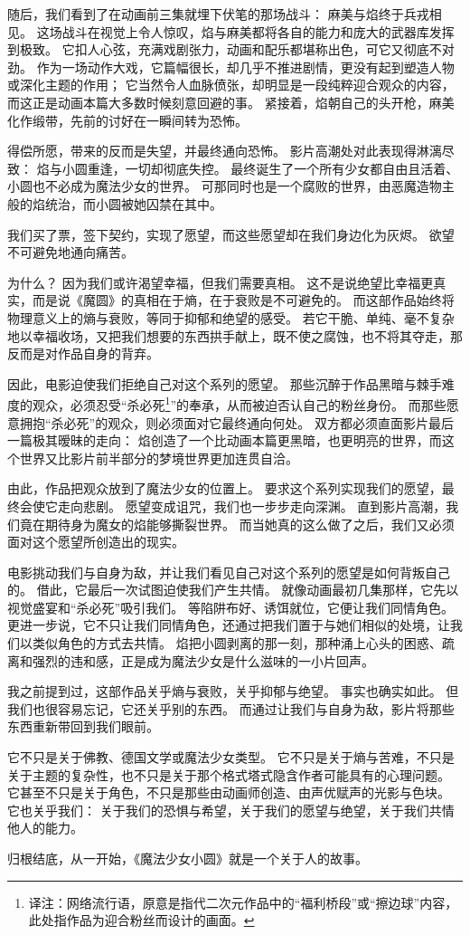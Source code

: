 随后，我们看到了在动画前三集就埋下伏笔的那场战斗：
麻美与焰终于兵戎相见。
这场战斗在视觉上令人惊叹，焰与麻美都将各自的能力和庞大的武器库发挥到极致。
它扣人心弦，充满戏剧张力，动画和配乐都堪称出色，可它又彻底不对劲。
作为一场动作大戏，它篇幅很长，却几乎不推进剧情，更没有起到塑造人物或深化主题的作用；
它当然令人血脉偾张，却明显是一段纯粹迎合观众的内容，而这正是动画本篇大多数时候刻意回避的事。
紧接着，焰朝自己的头开枪，麻美化作缎带，先前的讨好在一瞬间转为恐怖。

得偿所愿，带来的反而是失望，并最终通向恐怖。
影片高潮处对此表现得淋漓尽致：
焰与小圆重逢，一切却彻底失控。
最终诞生了一个所有少女都自由且活着、小圆也不必成为魔法少女的世界。
可那同时也是一个腐败的世界，由恶魔造物主般的焰统治，而小圆被她囚禁在其中。

我们买了票，签下契约，实现了愿望，而这些愿望却在我们身边化为灰烬。
欲望不可避免地通向痛苦。

为什么？
因为我们或许渴望幸福，但我们需要真相。
这不是说绝望比幸福更真实，而是说《魔圆》的真相在于熵，在于衰败是不可避免的。
而这部作品始终将物理意义上的熵与衰败，等同于抑郁和绝望的感受。
若它干脆、单纯、毫不复杂地以幸福收场，又把我们想要的东西拱手献上，既不使之腐蚀，也不将其夺走，那反而是对作品自身的背弃。

因此，电影迫使我们拒绝自己对这个系列的愿望。
那些沉醉于作品黑暗与棘手难度的观众，必须忍受“杀必死\footnote{
    译注：网络流行语，原意是指代二次元作品中的“福利桥段”或“擦边球”内容，此处指作品为迎合粉丝而设计的画面。
}”的奉承，从而被迫否认自己的粉丝身份。
而那些愿意拥抱“杀必死”的观众，则必须面对它最终通向何处。
双方都必须直面影片最后一篇极其暧昧的走向：
焰创造了一个比动画本篇更黑暗，也更明亮的世界，而这个世界又比影片前半部分的梦境世界更加连贯自洽。

由此，作品把观众放到了魔法少女的位置上。
要求这个系列实现我们的愿望，最终会使它走向悲剧。
愿望变成诅咒，我们也一步步走向深渊。
直到影片高潮，我们竟在期待身为魔女的焰能够撕裂世界。
而当她真的这么做了之后，我们又必须面对这个愿望所创造出的现实。

电影挑动我们与自身为敌，并让我们看见自己对这个系列的愿望是如何背叛自己的。
借此，它最后一次试图迫使我们产生共情。
就像动画最初几集那样，它先以视觉盛宴和“杀必死”吸引我们。
等陷阱布好、诱饵就位，它便让我们同情角色。
更进一步说，它不只让我们同情角色，还通过把我们置于与她们相似的处境，让我们以类似角色的方式去共情。
焰把小圆剥离的那一刻，那种涌上心头的困惑、疏离和强烈的违和感，正是成为魔法少女是什么滋味的一小片回声。

我之前提到过，这部作品关乎熵与衰败，关乎抑郁与绝望。
事实也确实如此。
但我们也很容易忘记，它还关乎别的东西。
而通过让我们与自身为敌，影片将那些东西重新带回到我们眼前。

它不只是关于佛教、德国文学或魔法少女类型。
它不只是关于熵与苦难，不只是关于主题的复杂性，也不只是关于那个格式塔式隐含作者可能具有的心理问题。
它甚至不只是关于角色，不只是那些由动画师创造、由声优赋声的光影与色块。
它也关乎我们：
关于我们的恐惧与希望，关于我们的愿望与绝望，关于我们共情他人的能力。

归根结底，从一开始，《魔法少女小圆》就是一个关于人的故事。
